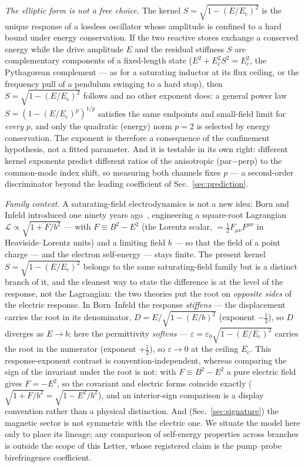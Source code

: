 \documentclass[aps,prd,twocolumn,superscriptaddress,nofootinbib,longbibliography]{revtex4-2}
\newcommand{\Ec}{E_{\mathrm{c}}}
\begin{document}
\emph{The elliptic form is not a free choice.} The kernel
$S=\sqrt{1-(E/\Ec)^2}$ is the unique response of a lossless oscillator whose
amplitude is confined to a hard bound under energy conservation. If the two
reactive stores exchange a conserved energy while the drive amplitude $E$ and the
residual stiffness $S$ are complementary components of a fixed-length state
($E^2+\Ec^2 S^2=\Ec^2$, the Pythagorean complement --- as for a saturating
inductor at its flux ceiling, or the frequency pull of a pendulum swinging to a
hard stop), then $S=\sqrt{1-(E/\Ec)^2}$ follows and no other exponent does: a
general power law $S=(1-(E/\Ec)^p)^{1/p}$ satisfies the same endpoints and
small-field limit for \emph{every} $p$, and only the quadratic (energy) norm
$p=2$ is selected by energy conservation. The exponent is therefore a consequence
of the confinement hypothesis, not a fitted parameter. And it is testable in its own right:
different kernel exponents predict different ratios of the anisotropic (par$-$perp)
to the common-mode index shift, so measuring both channels fixes $p$ --- a
second-order discriminator beyond the leading coefficient of Sec.~\ref{sec:prediction}.

\emph{Family context.} A saturating-field electrodynamics is not a new idea: Born
and Infeld introduced one ninety years ago~\cite{BornInfeld1934}, engineering a
square-root Lagrangian $\mathcal L\propto\sqrt{1+F/b^2}$ --- with $F\equiv B^2-E^2$
(the Lorentz scalar, $=\tfrac12 F_{\mu\nu}F^{\mu\nu}$ in Heaviside--Lorentz units)
and a limiting field $b$ --- so that the field of a point charge --- and the
electron self-energy --- stays finite. The present kernel $S=\sqrt{1-(E/\Ec)^2}$ belongs to the same
saturating-field family but is a distinct branch of it, and the cleanest way to
state the difference is at the level of the response, not the Lagrangian: the two
theories put the root on \emph{opposite sides} of the electric response. In
Born--Infeld the response \emph{stiffens} --- the displacement carries the root in
its denominator, $D=E/\sqrt{1-(E/b)^2}$ (exponent $-\tfrac12$), so $D$ diverges as
$E\to b$; here the permittivity \emph{softens} --- $\varepsilon=\varepsilon_0
\sqrt{1-(E/\Ec)^2}$ carries the root in the numerator (exponent $+\tfrac12$), so
$\varepsilon\to0$ at the ceiling $\Ec$. This response-exponent contrast is
convention-independent, whereas comparing the sign of the invariant under the root
is not: with $F\equiv B^2-E^2$ a pure electric field gives $F=-E^2$, so the
covariant and electric forms coincide exactly ($\sqrt{1+F/b^2}=\sqrt{1-E^2/b^2}$),
and an interior-sign comparison is a display convention rather than a physical
distinction. And (Sec.~\ref{sec:signature}) the magnetic sector is not symmetric
with the electric one. We situate the model here only to place its lineage; any
comparison of self-energy properties across branches is outside the scope of this
Letter, whose registered claim is the pump--probe birefringence coefficient.
\end{document}
